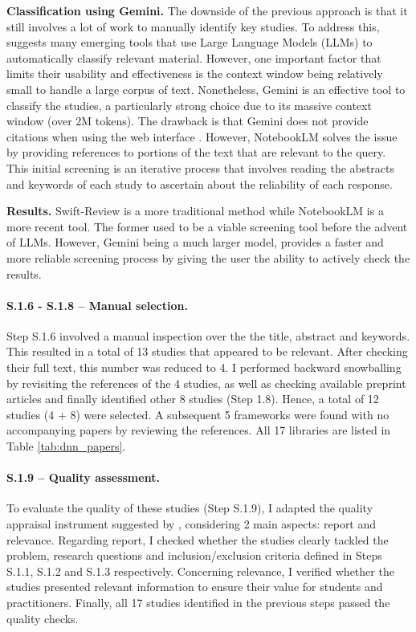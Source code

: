 \textbf{Classification using Gemini.}
The downside of the previous approach is that it still involves a lot of work to manually identify key
studies. To address this, \cite{bolanos_artificial_2024} suggests many emerging tools that use Large Language Models (LLMs)
to automatically classify relevant material. However, one important factor that limits their usability and effectiveness is the
context window being relatively small to handle a large corpus of text. Nonetheless, Gemini \cite{team_gemini_2024}
is an effective tool to classify the studies, a particularly strong choice due to its massive
context window (over 2M tokens). The drawback is that Gemini does not provide citations when using the web interface
\cite{noauthor_gemini_nodate}. However, NotebookLM \cite{notebooklm_google_2024} solves the issue by providing references
to portions of the text that are relevant to the query. This initial screening is an iterative process that involves
reading the abstracts and keywords of each study to ascertain about the reliability of each response.

\textbf{Results.}
Swift-Review is a more traditional method while NotebookLM is a more recent tool. The former used
to be a viable screening tool before the advent of LLMs. However, Gemini being a much larger model,
provides a faster and more reliable screening process by giving the user the ability to actively
check the results.

\paragraph{S.1.6 - S.1.8 -- Manual selection.}
Step S.1.6 involved a manual inspection over the the title, abstract and keywords. This resulted in
a total of 13 studies that appeared to be relevant. After checking their full text, this number was
reduced to 4. I performed backward snowballing \cite{jalali_systematic_2012} by revisiting the
references of the 4 studies, as well as checking available preprint articles and finally identified
other 8 studies (Step 1.8). Hence, a total of 12 studies (4 + 8) were selected. A subsequent 5
frameworks were found with no accompanying papers by reviewing the references. All 17 libraries are
listed in Table \ref{tab:dnn_papers}.

\paragraph{S.1.9 -- Quality assessment.}
To evaluate the quality of these studies (Step S.1.9), I adapted the quality appraisal instrument
suggested by \cite{zhou_map_2016}, considering 2 main aspects: report and relevance. Regarding
report, I checked whether the studies clearly tackled the problem, research questions and
inclusion/exclusion criteria defined in Steps S.1.1, S.1.2 and S.1.3 respectively. Concerning
relevance, I verified whether the studies presented relevant information to ensure their value for
students and practitioners. Finally, all 17 studies identified in the previous steps passed the
quality checks.

